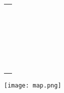 \documentclass[9pt,twoside,openright,final,article,letterpaper]{memoir}
\begin{document}
\begin{tabular}{l}
  \hspace{6.5in} \\
  \hline \\
  \hline \\
  \hline \\
  \hline \\
  \hline \\
  \hline \\
  \hline \\
  \hline \\
  \hline \\
  \hline \\
  \hline \\
  \hline \\
  \hline \\
  \hline \\
  \hline \\
  \hline \\
  \hline \\
  \hline \\
  \hline \\
  \hline \\
  \hline \\
  \hline \\
  \hline \\
\end{tabular}

\thispagestyle{headings}
\newpage
\pagestyle{empty}
\thispagestyle{empty}

\thispagestyle{empty}
\vfill
\texttt{[image: map.png]}
\vfill
\end{document}
